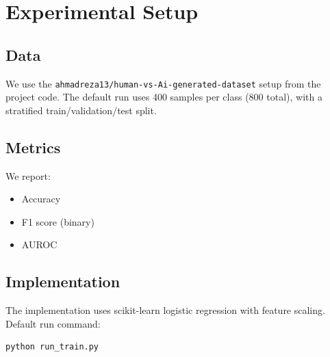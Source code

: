 \section{Experimental Setup}

\subsection{Data}

We use the \texttt{ahmadreza13/human-vs-Ai-generated-dataset} setup from the
project code. The default run uses 400 samples per class (800 total), with a
stratified train/validation/test split.

\subsection{Metrics}

We report:
\begin{itemize}
  \item Accuracy
  \item F1 score (binary)
  \item AUROC
\end{itemize}

\subsection{Implementation}

The implementation uses scikit-learn logistic regression with feature scaling.
Default run command:
\begin{verbatim}
python run_train.py
\end{verbatim}

